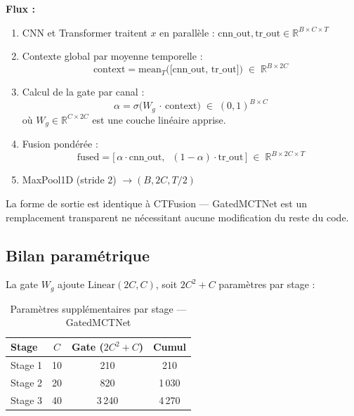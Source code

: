 \textbf{Flux :}
\begin{enumerate}
  \item CNN et Transformer traitent $x$ en parallèle :
        $\text{cnn\_out}, \text{tr\_out} \in \mathbb{R}^{B \times C \times T}$
  \item Contexte global par moyenne temporelle :
        \begin{equation}
          \text{context} = \text{mean}_T\!\Big(\big[\text{cnn\_out},\,\text{tr\_out}\big]\Big)
          \;\in\; \mathbb{R}^{B \times 2C}
        \end{equation}
  \item Calcul de la gate par canal :
        \begin{equation}
          \alpha = \sigma\!\big(W_g\,\cdot\,\text{context}\big)
          \;\in\; (0,1)^{B \times C}
        \end{equation}
        où $W_g \in \mathbb{R}^{C \times 2C}$ est une couche linéaire apprise.
  \item Fusion pondérée :
        \begin{equation}
          \text{fused} = \big[\,\alpha \cdot \text{cnn\_out},\;\;
          (1-\alpha) \cdot \text{tr\_out}\,\big]
          \;\in\; \mathbb{R}^{B \times 2C \times T}
        \end{equation}
  \item MaxPool1D (stride 2) $\to (B, 2C, T/2)$
\end{enumerate}

La forme de sortie est identique à CTFusion — GatedMCTNet est un remplacement
transparent ne nécessitant aucune modification du reste du code.

\subsection{Bilan paramétrique}

La gate $W_g$ ajoute $\text{Linear}(2C, C)$, soit $2C^2 + C$ paramètres
par stage :

\begin{table}[H]
\centering
\caption{Paramètres supplémentaires par stage — GatedMCTNet}
\label{tab:gate_params}
\begin{tabular}{lccc}
\toprule
\textbf{Stage} & $C$ & \textbf{Gate ($2C^2+C$)} & \textbf{Cumul} \\
\midrule
Stage 1 & 10 &  210 &   210 \\
Stage 2 & 20 &  820 & 1\,030 \\
Stage 3 & 40 & 3\,240 & 4\,270 \\
\bottomrule
\end{tabular}
\end{table}

